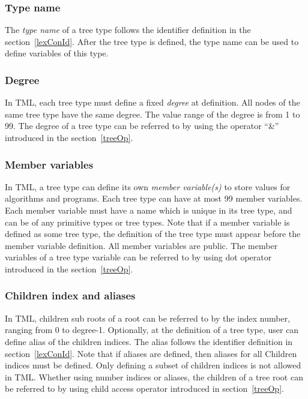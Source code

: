 \documentclass[12pt,psfig,a4]{article}
\begin{document}
\subsubsection {Type name}
The \textit{type name} of a tree type follows the identifier definition in the section~\ref{lexConId}. After the tree type is defined, the type name can be used to define variables of this type.

\subsubsection {Degree}
In TML, each tree type must define a fixed \textit{degree} at definition. All nodes of the same tree type have the same degree. The value range of the degree is from 1 to 99. The degree of a tree type can be referred to by using  the operator ``\&'' introduced in the section~\ref{treeOp}.


\subsubsection {Member variables}
In TML, a tree type can define its own \textit{member variable(s)} to store values for algorithms and programs. Each tree type can have at most 99 member variables. Each member variable must have a name which is unique in its tree type, and can be of any primitive types or tree types. Note that if a member variable is defined as some tree type, the definition of the tree type must appear before the member variable definition. All member variables are public. The member variables of a tree type variable can be referred to by using dot operator introduced in the section~\ref{treeOp}.


\subsubsection {Children index and aliases}
In TML, children sub roots of a root can be referred to by the index number, ranging from 0 to degree-1. Optionally, at the definition of a tree type, user can define alias of the children indices. The alias follows the identifier definition in section~\ref{lexConId}. Note that if aliases are defined, then aliases for all Children indices must be defined. Only defining a subset of children indices is not allowed in TML. Whether using number indices or aliases, the children of a tree root can be referred to by using child access operator introduced in section~\ref{treeOp}.
\end{document}
